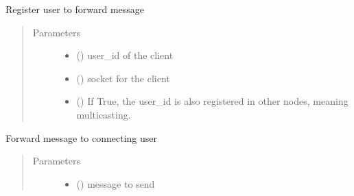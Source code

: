 \documentclass[letterpaper,10pt,english]{sphinxmanual}
\begin{document}
\begin{fulllineitems}
\begin{fulllineitems}
\label{\detokenize{bbc1.core.user_message_routing:bbc1.core.user_message_routing.UserMessageRoutingDummy.register_user}}
Register user to forward message
\begin{quote}\begin{description}
\item[{Parameters}] \leavevmode\begin{itemize}
\item {} 
 () \textendash{} user\_id of the client

\item {} 
 () \textendash{} socket for the client

\item {} 
 () \textendash{} If True, the user\_id is also registered in other nodes, meaning multicasting.

\end{itemize}

\end{description}\end{quote}

\end{fulllineitems}


\begin{fulllineitems}
\label{\detokenize{bbc1.core.user_message_routing:bbc1.core.user_message_routing.UserMessageRoutingDummy.send_message_to_user}}
Forward message to connecting user
\begin{quote}\begin{description}
\item[{Parameters}] \leavevmode\begin{itemize}
\item {} 
 () \textendash{} message to send


\end{itemize}
\end{description}
\end{quote}
\end{fulllineitems}
\end{fulllineitems}
\end{document}
